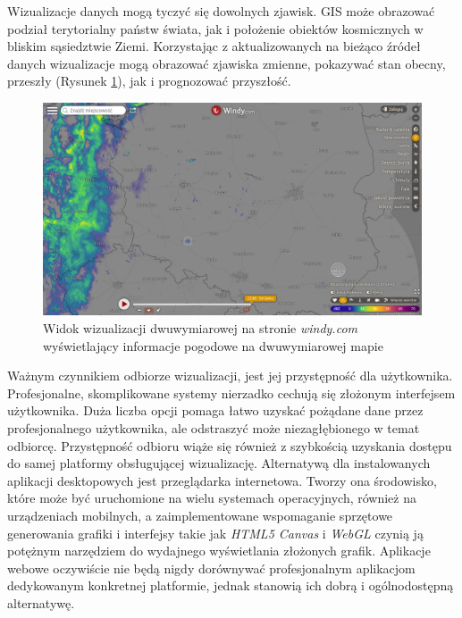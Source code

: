 Wizualizacje danych mogą tyczyć się dowolnych zjawisk. GIS może obrazować podział terytorialny państw świata, jak i położenie obiektów kosmicznych w bliskim sąsiedztwie Ziemi. Korzystając z aktualizowanych na bieżąco źródeł danych wizualizacje mogą obrazować zjawiska zmienne, pokazywać stan obecny, przeszły (Rysunek \ref{fig:c1_windy}), jak i prognozować przyszłość. 

\begin{figure}[h]
    \centering
    \includegraphics[width=\linewidth]{img/c1_windy.png}
    \caption{Widok wizualizacji dwuwymiarowej na stronie \textit{windy.com} wyświetlający informacje pogodowe na dwuwymiarowej mapie}
    \label{fig:c1_windy}
\end{figure}

Ważnym czynnikiem odbiorze wizualizacji, jest jej przystępność dla użytkownika. Profesjonalne, skomplikowane systemy nierzadko cechują się złożonym interfejsem użytkownika. Duża liczba opcji pomaga łatwo uzyskać pożądane dane przez profesjonalnego użytkownika, ale odstraszyć może niezagłębionego w temat odbiorcę. Przystępność odbioru wiąże się również z szybkością uzyskania dostępu do samej platformy obsługującej wizualizację. Alternatywą dla instalowanych aplikacji desktopowych jest przeglądarka internetowa. Tworzy ona środowisko, które może być uruchomione na wielu systemach operacyjnych, również na urządzeniach mobilnych, a zaimplementowane wspomaganie sprzętowe generowania grafiki i interfejsy takie jak \textit{HTML5 Canvas}\cite{Canvas} i \textit{WebGL}\cite{WebGL} czynią ją potężnym narzędziem do wydajnego wyświetlania złożonych grafik. 
Aplikacje webowe oczywiście nie będą nigdy dorównywać profesjonalnym aplikacjom dedykowanym konkretnej platformie, jednak stanowią ich dobrą i ogólnodostępną alternatywę.

